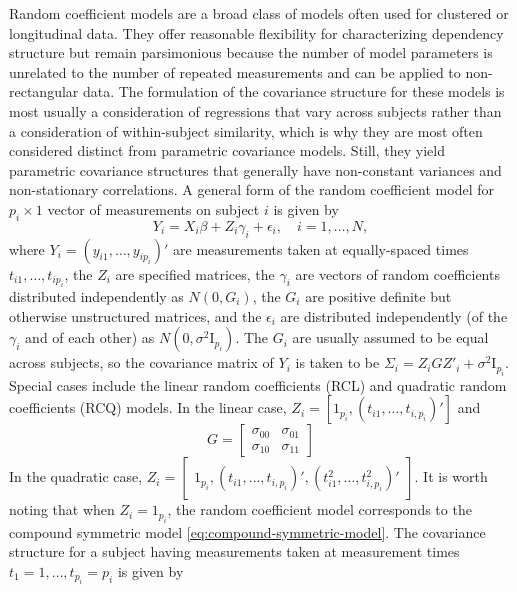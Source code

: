 Random coefficient models are a broad class of models often used for clustered or longitudinal data. They offer reasonable flexibility for characterizing dependency structure but remain parsimonious because the number of model parameters is unrelated to the number of repeated measurements and can be applied to non-rectangular data.  The formulation of the covariance structure for these models is most usually a consideration of regressions that vary across subjects rather than a consideration of within-subject similarity, which is why they are most often considered distinct from parametric covariance models. Still, they yield parametric covariance structures that generally have non-constant variances and non-stationary correlations.  A general form of the random coefficient model for $p_i \times 1$ vector of measurements on subject $i$ is given by 
\begin{equation}
Y_i = X_i\beta + Z_i \gamma_i + \epsilon_i, \quad i = 1, \dots, N,
\end{equation}
\noindent
where $Y_i = \left(y_{i1}, \dots, y_{ip_i}\right)'$ are measurements taken at equally-spaced times $t_{i1},\dots,  t_{ip_i}$, the $Z_i$ are specified matrices, the $\gamma_i$ are vectors of random coefficients distributed independently as $N \left(0, G_i\right)$, the $G_i$ are positive definite but otherwise unstructured matrices, and the $\epsilon_i$ are distributed independently (of the $\gamma_i$ and of each other) as $N \left(0, \sigma^2 \mathrm{I}_{p_i}\right)$. The $G_i$ are usually assumed to be equal across subjects, so the covariance matrix of $Y_i$ is taken to be $\Sigma_i = Z_i GZ'_i + \sigma^2 \mathrm{I}_{p_i}$. Special cases include the linear random coefficients (RCL) and quadratic random coefficients (RCQ) models. In the linear case, $Z_i = \left[1_{p_i} , \left(t_{i1},\dots,t_{i, p_i}\right)'\right]$ and 
\begin{equation*}
G = \begin{bmatrix}
\sigma_{00} & \sigma_{01} \\
\sigma_{10} & \sigma_{11} 
\end{bmatrix}
\end{equation*}
\noindent
In the quadratic case, $Z_i =\begin{bmatrix}1_{p_i}, \left(t_{i1}, \dots, t_{i,p_i}\right)', \left(t^2_{i1}, \dots, t^2_{i,p_i}\right)'\end{bmatrix}$. It is worth noting that when $Z_i = 1_{p_i}$, the random coefficient model corresponds to the compound symmetric model \eqref{eq:compound-symmetric-model}. The covariance structure for a subject having measurements taken at measurement times $t_1 = 1, \dots,t_{p_i} = p_i$ is given by  
